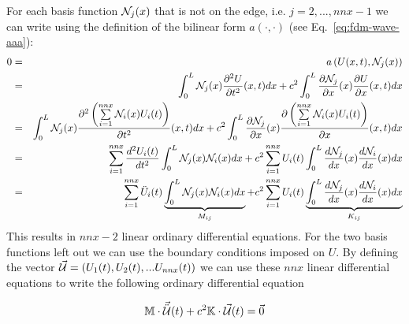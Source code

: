 For each basis function ${\mathcal{N}}_j(x)$ that is not on the edge, i.e. $j=2,...,nnx-1$ we can write using the definition of the bilinear form $a(\cdot,\cdot)$ (see Eq.~\eqref{eq:fdm-wave-aaa}):
\begin{eqnarray}
0 
&=& a\left(U(x,t),  {\mathcal{N}}_j(x) \right)  \nonumber\\
&=&\int_0^L  {\mathcal{N}}_j(x)  \frac{\partial^2 U}{\partial t^2}(x,t)  dx
+c^2 \int_0^L  \frac{\partial {\mathcal{N}}_j}{\partial x}(x)  \frac{\partial U}{\partial x}(x,t)  dx \nonumber\\
&=&\int_0^L  {\mathcal{N}}_j(x)  \frac{\partial^2 \left(\sum\limits_{i=1}^{nnx} {\mathcal{N}}_i(x)  U_i(t) \right)}{\partial t^2}(x,t)  dx
+c^2 \int_0^L  \frac{\partial {\mathcal{N}}_j}{\partial x}(x)  \frac{\partial \left(\sum\limits_{i=1}^{nnx} {\mathcal{N}}_i(x)  U_i(t) \right)}{\partial x}(x,t)  dx \nonumber\\
&=&\sum\limits_{i=1}^{nnx} \frac{d^2  U_i(t) }{d t^2}  \int_0^L  {\mathcal{N}}_j(x) {\mathcal{N}}_i(x)   dx
+c^2 \sum\limits_{i=1}^{nnx} U_i(t)  \int_0^L  \frac{d {\mathcal{N}}_j}{d x} (x) \frac{d {\mathcal{N}}_i  }{d x}(x)  dx \nonumber\\
&=&\sum\limits_{i=1}^{nnx}   \ddot{U}_i(t)   \underbrace{\int_0^L  {\mathcal{N}}_j(x) {\mathcal{N}}_i(x)   dx}_{M_{ij}}
+c^2 \sum\limits_{i=1}^{nnx} U_i(t)  
\underbrace{\int_0^L  \frac{d {\mathcal{N}}_j}{d x} (x) \frac{d {\mathcal{N}}_i  }{d x}(x)  dx}_{K_{ij}} \nonumber\\
\end{eqnarray}
This results in $nnx-2$ linear ordinary differential equations.
For the two basis functions left out we can use
the boundary conditions imposed on $U$.
By defining the vector $\vec{\cal U}=(U_1(t),U_2(t),...U_{nnx}(t))$ 
we can use these $nnx$ linear differential equations to 
write the following ordinary differential equation
\begin{mdframed}[backgroundcolor=blue!5]
\begin{equation}
{\mathbb{M}} \cdot \vec{\ddot{{\cal U}}}(t) + c^2 {\mathbb{K}} \cdot \vec{\cal U}(t) = \vec{0}
\label{ss:waveq1}
\end{equation}
\end{mdframed}

